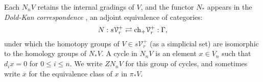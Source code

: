 \documentclass[11pt]{amsart}
\theoremstyle{plain}
\theoremstyle{definition}
\newcommand{\calV}{\mathcal{V}}
\theoremstyle{plain}
\newcommand{\vect}[2]{\calV^{#1}_{#2}}
\newcommand{\complexes}{\textup{ch}_+}
\begin{document}
\begin{Conventions and notation}
Each $N_nV$ retains the internal gradings of $V$, and the functor $N_*$ appears in the \emph{Dold-Kan correspondence} \cite[\S III.2]{goerss-jardine.pdf}, an adjoint equivalence of categories:
\[N:s\vect{+}{r}\rightleftarrows \complexes \vect{+}{r}:\Gamma,\]
under which the homotopy groups of $V\in s\vect{+}{r}$ (as a simplicial set)  are isomorphic to the homology groups of $N_*V$.
%
A cycle in $N_nV$ is an element $x\in V_n$ such that $d_ix=0$ for $0\leq i\leq n$. We write $ZN_nV$ for this group of cycles, and sometimes write $\overline{x}$ for the equivalence class of $x$ in $\pi_*V$.


\end{Conventions and notation}
\end{document}
